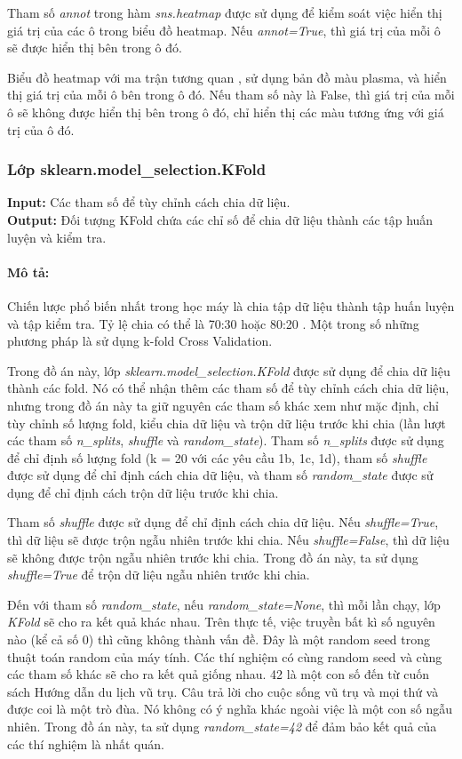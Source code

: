 \documentclass[]{article}
\begin{document}
Tham số \textit{annot} trong hàm \textit{sns.heatmap} được sử dụng để kiểm soát việc hiển thị giá trị của các ô trong biểu đồ heatmap. Nếu \textit{annot=True}, thì giá trị của mỗi ô sẽ được hiển thị bên trong ô đó.

Biểu đồ heatmap với ma trận tương quan , sử dụng bản đồ màu plasma, và hiển thị giá trị của mỗi ô bên trong ô đó. Nếu tham số này là False, thì giá trị của mỗi ô sẽ không được hiển thị bên trong ô đó, chỉ hiển thị các màu tương ứng với giá trị của ô đó.

\subsubsection{Lớp sklearn.model\_selection.KFold}
\noindent
\textbf{Input:} Các tham số để tùy chỉnh cách chia dữ liệu. \\
\textbf{Output:} Đối tượng KFold chứa các chỉ số để chia dữ liệu thành các tập huấn luyện và kiểm tra.
\paragraph{Mô tả:} 
Chiến lược phổ biến nhất trong học máy là chia tập dữ liệu thành tập huấn luyện và tập kiểm tra. Tỷ lệ chia có thể là 70:30 hoặc 80:20 \cite{r1}. Một trong số những phương pháp là sử dụng k-fold Cross Validation. \cite{mediumCrossValidationUsing}

Trong đồ án này, lớp \textit{sklearn.model\_selection.KFold} \cite{scikitlearnSklearnmodel} được sử dụng để chia dữ liệu thành các fold. Nó có thể nhận thêm các tham số để tùy chỉnh cách chia dữ liệu, nhưng trong đồ án này ta giữ nguyên các tham số khác xem như mặc định, chỉ tùy chỉnh số lượng fold, kiểu chia dữ liệu và trộn dữ liệu trước khi chia (lần lượt các tham số \textit{n\_splits}, \textit{shuffle} và \textit{random\_state}). Tham số \textit{n\_splits} được sử dụng để chỉ định số lượng fold (k = 20 với các yêu cầu 1b, 1c, 1d), tham số \textit{shuffle} được sử dụng để chỉ định cách chia dữ liệu, và tham số \textit{random\_state} được sử dụng để chỉ định cách trộn dữ liệu trước khi chia.

Tham số \textit{shuffle} được sử dụng để chỉ định cách chia dữ liệu. Nếu \textit{shuffle=True}, thì dữ liệu sẽ được trộn ngẫu nhiên trước khi chia. Nếu \textit{shuffle=False}, thì dữ liệu sẽ không được trộn ngẫu nhiên trước khi chia. Trong đồ án này, ta sử dụng \textit{shuffle=True} để trộn dữ liệu ngẫu nhiên trước khi chia.

Đến với tham số \textit{random\_state}, nếu \textit{random\_state=None}, thì mỗi lần chạy, lớp \textit{KFold} sẽ cho ra kết quả khác nhau. Trên thực tế, việc truyền bất kì số nguyên nào (kể cả số 0) thì cũng không thành vấn đề. Đây là một random seed trong thuật toán random của máy tính. \cite{wikipediaRandomSeed} Các thí nghiệm có cùng random seed và cùng các tham số khác sẽ cho ra kết quả giống nhau. 42 là một con số đến từ cuốn sách Hướng dẫn du lịch vũ trụ. Câu trả lời cho cuộc sống vũ trụ và mọi thứ và được coi là một trò đùa. Nó không có ý nghĩa khác ngoài việc là một con số ngẫu nhiên. \cite{stackoverflowRandomState} Trong đồ án này, ta sử dụng \textit{random\_state=42} để đảm bảo kết quả của các thí nghiệm là nhất quán.
\end{document}

